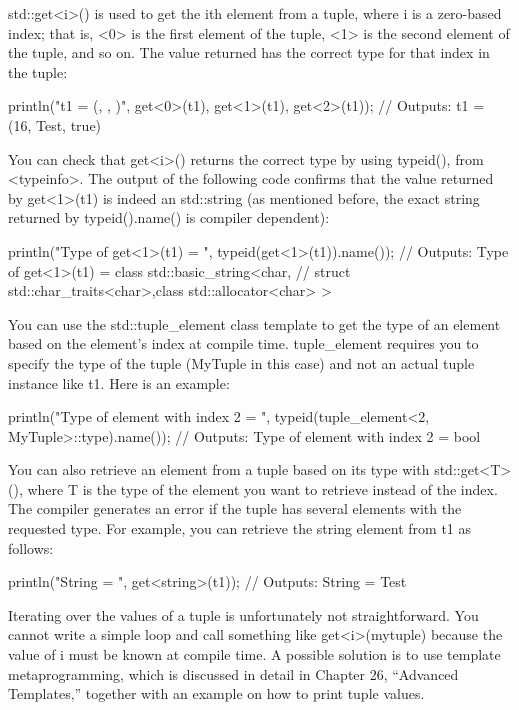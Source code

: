 std::get<i>() is used to get the ith element from a tuple, where i is a zero-based index; that is, <0> is the first element of the tuple, <1> is the second element of the tuple, and so on. The value returned has the correct type for that index in the tuple:

\begin{cpp}
println("t1 = ({}, {}, {})", get<0>(t1), get<1>(t1), get<2>(t1));
// Outputs: t1 = (16, Test, true)
\end{cpp}

You can check that get<i>() returns the correct type by using typeid(), from <typeinfo>. The output of the following code confirms that the value returned by get<1>(t1) is indeed an std::string (as mentioned before, the exact string returned by typeid().name() is compiler dependent):

\begin{cpp}
println("Type of get<1>(t1) = {}", typeid(get<1>(t1)).name());
// Outputs: Type of get<1>(t1) = class std::basic_string<char,
// struct std::char_traits<char>,class std::allocator<char> >
\end{cpp}

You can use the std::tuple\_element class template to get the type of an element based on the element’s index at compile time. tuple\_element requires you to specify the type of the tuple (MyTuple in this case) and not an actual tuple instance like t1. Here is an example:

\begin{cpp}
println("Type of element with index 2 = {}",
    typeid(tuple_element<2, MyTuple>::type).name());
// Outputs: Type of element with index 2 = bool
\end{cpp}

You can also retrieve an element from a tuple based on its type with std::get<T>(), where T is the type of the element you want to retrieve instead of the index. The compiler generates an error if the tuple has several elements with the requested type. For example, you can retrieve the string element from t1 as follows:

\begin{cpp}
println("String = {}", get<string>(t1));
// Outputs: String = Test
\end{cpp}

Iterating over the values of a tuple is unfortunately not straightforward. You cannot write a simple loop and call something like get<i>(mytuple) because the value of i must be known at compile time. A possible solution is to use template metaprogramming, which is discussed in detail in Chapter 26, “Advanced Templates,” together with an example on how to print tuple values.

